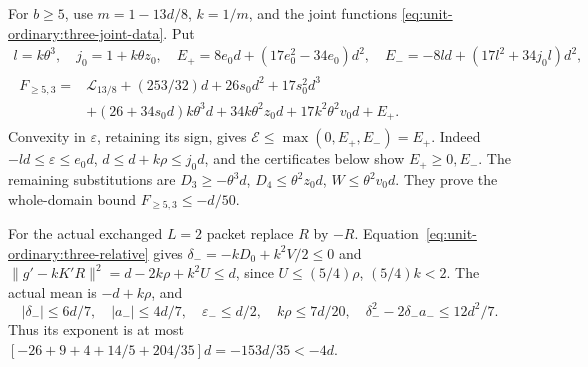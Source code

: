 For \(b\ge5\), use \(m=1-13d/8\), \(k=1/m\), and the joint
functions \eqref{eq:unit-ordinary:three-joint-data}. Put
\[
 \begin{gathered}
 l=k\theta^3,\quad j_0=1+k\theta z_0,\quad
 E_+=8e_0d+(17e_0^2-34e_0)d^2,\quad
 E_-=-8ld+(17l^2+34j_0l)d^2,\\
 \begin{aligned}
 F_{\ge5,3}={}&\mathcal L_{13/8}+(253/32)d+26s_0d^2+17s_0^2d^3\\
 &+(26+34s_0d)k\theta^3d+34k\theta^2z_0d
                       +17k^2\theta^2v_0d+E_+.
 \end{aligned}
 \end{gathered}
\]
Convexity in \(\varepsilon\), retaining its sign, gives
\(\mathcal E\le\max(0,E_+,E_-)=E_+\).
Indeed \(-ld\le\varepsilon\le e_0d\),
\(d\le d+k\rho\le j_0d\), and the certificates below show
\(E_+\ge0,E_-\). The remaining substitutions are
\(D_3\ge-\theta^3d\), \(D_4\le\theta^2z_0d\),
\(W\le\theta^2v_0d\). They prove the whole-domain bound
\(F_{\ge5,3}\le-d/50\).

For the actual exchanged \(L=2\) packet replace \(R\) by \(-R\).
Equation~\eqref{eq:unit-ordinary:three-relative} gives
\(\delta_-=-kD_0+k^2V/2\le0\) and
\(\|g'-kK'R\|^2=d-2k\rho+k^2U\le d\), since
\(U\le(5/4)\rho\), \((5/4)k<2\).
The actual mean is \(-d+k\rho\), and
\[
 |\delta_-|\le6d/7,\quad |a_-|\le4d/7,
 \quad\varepsilon_-\le d/2,\quad k\rho\le7d/20,
 \quad\delta_-^2-2\delta_-a_-\le12d^2/7.
\]
Thus its exponent is at most
\([-26+9+4+14/5+204/35]d=-153d/35<-4d\).

